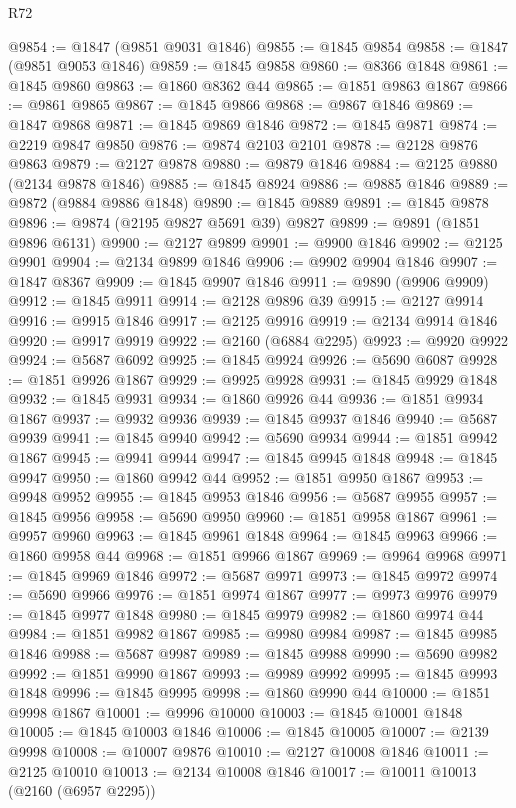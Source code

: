 \begin{lexlean}{R72}
\begin{coremodule}
@9854 := @1847 (@9851 @9031 @1846)
@9855 := @1845 @9854
@9858 := @1847 (@9851 @9053 @1846)
@9859 := @1845 @9858
@9860 := @8366 @1848
@9861 := @1845 @9860
@9863 := @1860 @8362 @44
@9865 := @1851 @9863 @1867
@9866 := @9861 @9865
@9867 := @1845 @9866
@9868 := @9867 @1846
@9869 := @1847 @9868
@9871 := @1845 @9869 @1846
@9872 := @1845 @9871
@9874 := @2219 @9847 @9850
@9876 := @9874 @2103 @2101
@9878 := @2128 @9876 @9863
@9879 := @2127 @9878
@9880 := @9879 @1846
@9884 := @2125 @9880 (@2134 @9878 @1846)
@9885 := @1845 @8924
@9886 := @9885 @1846
@9889 := @9872 (@9884 @9886 @1848)
@9890 := @1845 @9889
@9891 := @1845 @9878
@9896 := @9874 (@2195 @9827 @5691 @39) @9827
@9899 := @9891 (@1851 @9896 @6131)
@9900 := @2127 @9899
@9901 := @9900 @1846
@9902 := @2125 @9901
@9904 := @2134 @9899 @1846
@9906 := @9902 @9904 @1846
@9907 := @1847 @8367
@9909 := @1845 @9907 @1846
@9911 := @9890 (@9906 @9909)
@9912 := @1845 @9911
@9914 := @2128 @9896 @39
@9915 := @2127 @9914
@9916 := @9915 @1846
@9917 := @2125 @9916
@9919 := @2134 @9914 @1846
@9920 := @9917 @9919
@9922 := @2160 (@6884 @2295)
@9923 := @9920 @9922
@9924 := @5687 @6092
@9925 := @1845 @9924
@9926 := @5690 @6087
@9928 := @1851 @9926 @1867
@9929 := @9925 @9928
@9931 := @1845 @9929 @1848
@9932 := @1845 @9931
@9934 := @1860 @9926 @44
@9936 := @1851 @9934 @1867
@9937 := @9932 @9936
@9939 := @1845 @9937 @1846
@9940 := @5687 @9939
@9941 := @1845 @9940
@9942 := @5690 @9934
@9944 := @1851 @9942 @1867
@9945 := @9941 @9944
@9947 := @1845 @9945 @1848
@9948 := @1845 @9947
@9950 := @1860 @9942 @44
@9952 := @1851 @9950 @1867
@9953 := @9948 @9952
@9955 := @1845 @9953 @1846
@9956 := @5687 @9955
@9957 := @1845 @9956
@9958 := @5690 @9950
@9960 := @1851 @9958 @1867
@9961 := @9957 @9960
@9963 := @1845 @9961 @1848
@9964 := @1845 @9963
@9966 := @1860 @9958 @44
@9968 := @1851 @9966 @1867
@9969 := @9964 @9968
@9971 := @1845 @9969 @1846
@9972 := @5687 @9971
@9973 := @1845 @9972
@9974 := @5690 @9966
@9976 := @1851 @9974 @1867
@9977 := @9973 @9976
@9979 := @1845 @9977 @1848
@9980 := @1845 @9979
@9982 := @1860 @9974 @44
@9984 := @1851 @9982 @1867
@9985 := @9980 @9984
@9987 := @1845 @9985 @1846
@9988 := @5687 @9987
@9989 := @1845 @9988
@9990 := @5690 @9982
@9992 := @1851 @9990 @1867
@9993 := @9989 @9992
@9995 := @1845 @9993 @1848
@9996 := @1845 @9995
@9998 := @1860 @9990 @44
@10000 := @1851 @9998 @1867
@10001 := @9996 @10000
@10003 := @1845 @10001 @1848
@10005 := @1845 @10003 @1846
@10006 := @1845 @10005
@10007 := @2139 @9998
@10008 := @10007 @9876
@10010 := @2127 @10008 @1846
@10011 := @2125 @10010
@10013 := @2134 @10008 @1846
@10017 := @10011 @10013 (@2160 (@6957 @2295))

\end{coremodule}
\end{lexlean}
